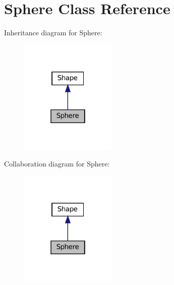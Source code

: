 \hypertarget{classSphere}{}\section{Sphere Class Reference}
\label{classSphere}


Inheritance diagram for Sphere\+:
\nopagebreak
\begin{figure}[H]
\begin{center}
\leavevmode
\includegraphics[width=130pt]{classSphere__inherit__graph}
\end{center}
\end{figure}


Collaboration diagram for Sphere\+:
\nopagebreak
\begin{figure}[H]
\begin{center}
\leavevmode
\includegraphics[width=130pt]{classSphere__coll__graph}
\end{center}
\end{figure}
